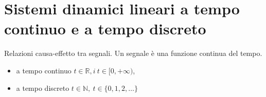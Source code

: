 \documentclass[10pt,a4paper]{book}
\begin{document}
\chapter{Sistemi dinamici lineari a tempo continuo e a tempo discreto}

Relazioni causa-effetto tra segnali. Un segnale è una funzione continua del tempo.
\begin{itemize}
\item a tempo continuo $t\in \mathbb{R} ,i\ t\in [ 0,+\infty )$,
\item a tempo discreto $t\in \mathbb{N} ,\ t\in \{0,1,2,\dotsc \}$
\end{itemize}
\end{document}
